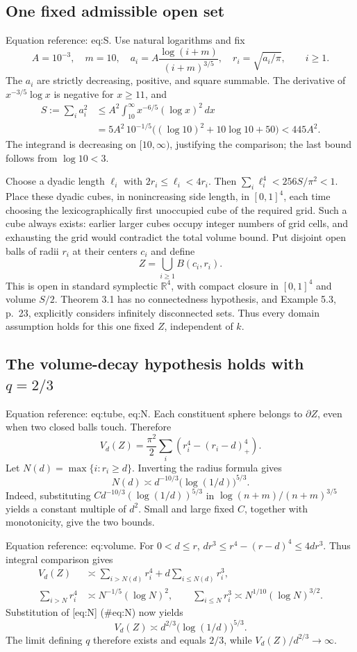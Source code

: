\documentclass[10pt]{article}
\begin{document}
\subsection*{One fixed admissible open set}
Equation reference: eq:S. Use natural logarithms and fix \[A=10^{-3},\quad m=10,\quad
 a_i=A\frac{\log(i+m)}{(i+m)^{3/5}},\quad
 r_i=\sqrt{a_i/\pi},\qquad i\ge1.\] The \(a_i\) are strictly decreasing, positive, and square summable. The derivative of \(x^{-3/5}\log x\) is negative for \(x\ge11\), and \[\begin{aligned}
 S:=\sum_i a_i^2
 &\le A^2\int_{10}^{\infty}x^{-6/5}(\log x)^2\,dx\\
 &=5A^2\,10^{-1/5}\bigl((\log10)^2+10\log10+50\bigr)
 <445A^2.\end{aligned}\] The integrand is decreasing on \([10,\infty)\), justifying the comparison; the last bound follows from \(\log10<3\).\par
Choose a dyadic length \(\ell_i\) with \(2r_i\le\ell_i<4r_i\). Then \(\sum_i\ell_i^4<256S/\pi^2<1\). Place these dyadic cubes, in nonincreasing side length, in \([0,1]^4\), each time choosing the lexicographically first unoccupied cube of the required grid. Such a cube always exists: earlier larger cubes occupy integer numbers of grid cells, and exhausting the grid would contradict the total volume bound. Put disjoint open balls of radii \(r_i\) at their centers \(c_i\) and define \[Z=\bigcup_{i\ge1}B(c_i,r_i).\] This is open in standard symplectic \(\mathbb R^4\), with compact closure in \([0,1]^4\) and volume \(S/2\). Theorem 3.1 has no connectedness hypothesis, and Example 5.3, p. 23, explicitly considers infinitely disconnected sets. Thus every domain assumption holds for this one fixed \(Z\), independent of \(k\).\par
\subsection*{The volume-decay hypothesis holds with \(q=2/3\)}
Equation reference: eq:tube, eq:N. Each constituent sphere belongs to \(\partial Z\), even when two closed balls touch. Therefore \[
 V_d(Z)=\frac{\pi^2}{2}\sum_i
 \left(r_i^4-(r_i-d)_+^4\right).\] Let \(N(d)=\max\{i:r_i\ge d\}\). Inverting the radius formula gives \[
 N(d)\asymp d^{-10/3}\bigl(\log(1/d)\bigr)^{5/3}.\] Indeed, substituting \(C d^{-10/3}(\log(1/d))^{5/3}\) in \(\log(n+m)/(n+m)^{3/5}\) yields a constant multiple of \(d^2\). Small and large fixed \(C\), together with monotonicity, give the two bounds.\par
Equation reference: eq:volume. For \(0<d\le r\), \(dr^3\le r^4-(r-d)^4\le4dr^3\). Thus integral comparison gives \[\begin{aligned}
 V_d(Z)&\asymp \sum_{i>N(d)}r_i^4+
                 d\sum_{i\le N(d)}r_i^3,\\
 \sum_{i>N}r_i^4&\asymp N^{-1/5}(\log N)^2,\qquad
 \sum_{i\le N}r_i^3\asymp N^{1/10}(\log N)^{3/2}.\end{aligned}\] Substitution of [eq:N] (\#eq:N) now yields \[
 V_d(Z)\asymp d^{2/3}\bigl(\log(1/d)\bigr)^{5/3}.\] The limit defining \(q\) therefore exists and equals \(2/3\), while \(V_d(Z)/d^{2/3}\to\infty\).\par
\end{document}
